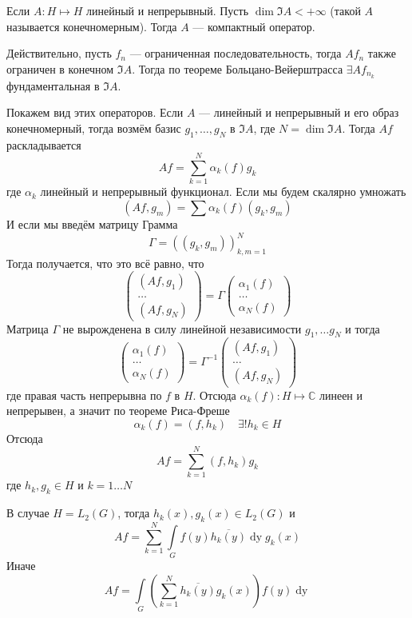 \documentclass[14pt]{extarticle}
\begin{document}
\begin{Prim}
    Если $A : H \mapsto H$ линейный и непрерывный.
    Пусть $\dim \Im A < +\infty$ (такой $A$ называется конечномерным).
    Тогда $A$ --- компактный оператор.
    
    Действительно, пусть $f_n$ --- ограниченная последовательность, тогда
    $A f_n$ также ограничен в конечном $\Im A$.
    Тогда по теореме Больцано-Вейерштрасса $\exists A f_{n_k}$ фундаментальная
    в $\Im A$.
    
    Покажем вид этих операторов.
    Если $A$ --- линейный и непрерывный и его образ конечномерный, тогда
    возмём базис $g_1, \dots, g_N$ в $\Im A$, где $N = \dim \Im A$.
    Тогда $Af$ раскладывается
    $$
    Af = \sum\limits_{k = 1}^N\alpha_k(f)g_k
    $$
    где $\alpha_k$ линейный и непрерывный функционал.
    Если мы будем скалярно умножать
    $$
    (Af, g_m) = \sum \alpha_k(f) (g_k, g_m)
    $$
    И если мы введём матрицу Грамма
    $$
    \Gamma = ((g_k, g_m))_{k,m=1}^N
    $$
    Тогда получается, что это всё равно, что
    $$
    \left(
        \begin{array}{c}
            (Af, g_1)\\
            \dots\\
            (Af, g_N)
        \end{array}
    \right)
    =
    \Gamma \left(
        \begin{array}{c}
            \alpha_1(f)\\
            \dots\\
            \alpha_N(f)
        \end{array}
        \right)
    $$
    Матрица $\Gamma$ не вырожденена в силу линейной независимости 
    $g_1, \dots g_N$ и тогда
    $$
    \left(
        \begin{array}{c}
            \alpha_1(f)\\
            \dots\\
            \alpha_N(f)
        \end{array}
    \right)
    =
    \Gamma^{-1}\left(
        \begin{array}{c}
            (Af, g_1)\\
            \dots\\
            (Af, g_N)
        \end{array}
    \right)
    $$
    где правая часть непрерывна по $f$ в $H$.
    Отсюда $\alpha_k(f) : H \mapsto \mathbb C$ линеен и непрерывен, а значит
    по теореме Риса-Фреше
    $$
    \alpha_k(f) = (f, h_k)\quad \exists! h_k \in H
    $$
    Отсюда
    $$
    Af = \sum\limits_{k = 1}^N(f, h_k)g_k
    $$
    где $h_k, g_k \in H$ и $k = 1 \dots N$
\end{Prim}
\begin{Prim}
    В случае $H = L_2(G)$, тогда $h_k(x), g_k(x) \in L_2(G)$ и
    $$
    Af = \sum\limits_{k = 1}^N \int\limits_G f(y)\overline{h_k(y)} \mathop{dy} 
    g_k(x) 
    $$
    Иначе
    $$
    Af = \int\limits_G \left(\sum\limits_{k = 1}^N \overline{h_k(y)} g_k(x)
    \right) f(y)\mathop{dy}
    $$
\end{Prim}
\end{document}
